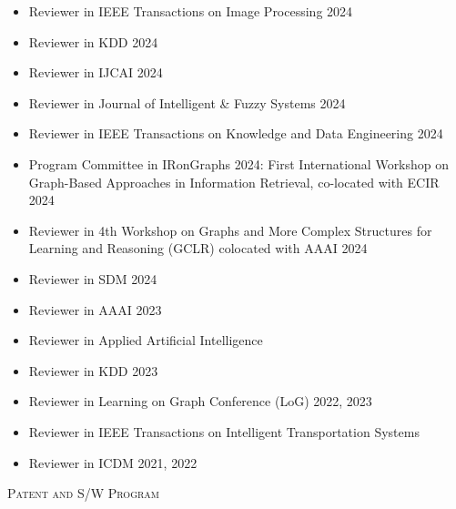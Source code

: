 \documentclass[10pt]{article}
\newenvironment{changemargin}[2]{
  \begin{list}{}{
    \setlength{\topsep}{0pt}
    \setlength{\leftmargin}{#1}
    \setlength{\rightmargin}{#2}
    \setlength{\listparindent}{\parindent}
    \setlength{\itemindent}{\parindent}
    \setlength{\parsep}{\parskip}
  }
  \item[]}{\end{list}
}
\newcommand{\lineover}{
	\begin{changemargin}{-0.05in}{-0.05in}
		\vspace*{-8pt}
		\hrulefill \\
		\vspace*{-2pt}
	\end{changemargin}
}
\newcommand{\header}[1]{
	\begin{changemargin}{-0.5in}{-0.5in}
		\scshape{#1}\\
  	\lineover
	\end{changemargin}
}
\newenvironment{body} {
	\vspace*{-16pt}
	\begin{changemargin}{-0.25in}{-0.5in}
  }
	{\end{changemargin}
}
\begin{document}
\begin{body}
	\vspace{14pt}
    \begin{itemize}
        \item Reviewer in IEEE Transactions on Image Processing 2024
        \item Reviewer in KDD 2024
        \item Reviewer in IJCAI 2024
        \item Reviewer in Journal of Intelligent \& Fuzzy Systems 2024
        \item Reviewer in IEEE Transactions on Knowledge and Data Engineering 2024
        \item Program Committee in IRonGraphs 2024: First International Workshop on Graph-Based Approaches in Information Retrieval, co-located with ECIR 2024
        \item Reviewer in 4th Workshop on Graphs and More Complex Structures for Learning and Reasoning (GCLR) colocated with AAAI 2024
        \item Reviewer in SDM 2024
        \item Reviewer in AAAI 2023
        \item Reviewer in Applied Artificial Intelligence 
        \item Reviewer in KDD 2023
        \item Reviewer in Learning on Graph Conference (LoG) 2022, 2023
        \item Reviewer in IEEE Transactions on Intelligent Transportation Systems
        \item Reviewer in ICDM 2021, 2022
    \end{itemize}
\end{body}

\medskip

\header{Patent and S/W Program}
\end{document}
